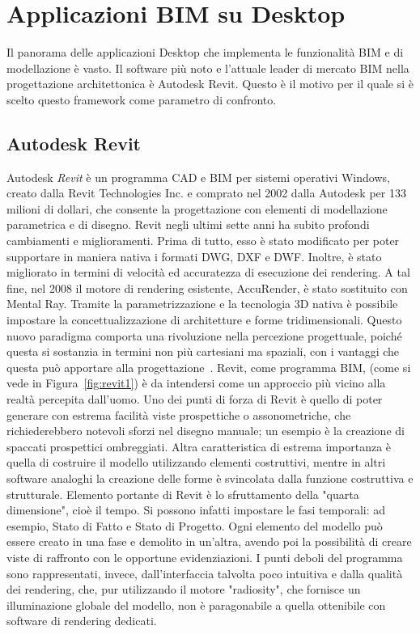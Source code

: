 \section{Applicazioni BIM su Desktop}
\label{sec:chapter_1_section_2}
Il panorama delle applicazioni Desktop che implementa le funzionalità BIM e di modellazione è vasto.
Il software più noto e l’attuale leader di mercato BIM nella
progettazione architettonica è Autodesk Revit. Questo è il motivo per il quale si è scelto questo framework come parametro di confronto.

\subsection*{Autodesk Revit}
\label{sec:chapter_1_section_2_sub_1}
Autodesk \emph{Revit} è un programma CAD e BIM per sistemi operativi Windows, creato dalla Revit Technologies Inc. e comprato
nel 2002 dalla Autodesk per 133 milioni di dollari, che consente la progettazione con elementi di modellazione parametrica
e di disegno.
Revit negli ultimi sette anni ha subito profondi cambiamenti e miglioramenti. Prima di tutto, esso è stato modificato per poter
supportare in maniera nativa i formati DWG, DXF e DWF. Inoltre, è stato migliorato in termini di velocità ed accuratezza di
esecuzione dei rendering. A tal fine, nel 2008 il motore di rendering esistente, AccuRender, è stato sostituito con Mental Ray.
Tramite la parametrizzazione e la tecnologia 3D nativa è possibile impostare la concettualizzazione di architetture e forme
tridimensionali. Questo nuovo paradigma comporta una rivoluzione nella percezione progettuale, poiché questa si sostanzia in
termini non più cartesiani ma spaziali, con i vantaggi che questa può apportare alla progettazione~\cite{BIMrevolution}.
Revit, come programma BIM, (come si vede in Figura~\ref{fig:revit1}) è da intendersi come un approccio più vicino alla realtà
percepita dall'uomo.
Uno dei punti di forza di Revit è quello di poter generare con estrema facilità viste prospettiche o assonometriche, che
richiederebbero notevoli sforzi nel disegno manuale; un esempio è la creazione di spaccati prospettici ombreggiati.
Altra caratteristica di estrema importanza è quella di costruire il modello utilizzando elementi costruttivi, mentre
in altri software analoghi la creazione delle forme è svincolata dalla funzione costruttiva e strutturale.
Elemento portante di Revit è lo sfruttamento della "quarta dimensione", cioè il tempo. Si possono infatti impostare le fasi
temporali: ad esempio, Stato di Fatto e Stato di Progetto. Ogni elemento del modello può essere creato in una fase e demolito
in un'altra, avendo poi la possibilità di creare viste di raffronto con le opportune evidenziazioni.
I punti deboli del programma sono rappresentati, invece, dall'interfaccia talvolta poco intuitiva e dalla qualità dei rendering,
che, pur utilizzando il motore "radiosity", che fornisce un illuminazione globale del modello, non è paragonabile
a quella ottenibile con software di rendering dedicati.\\

